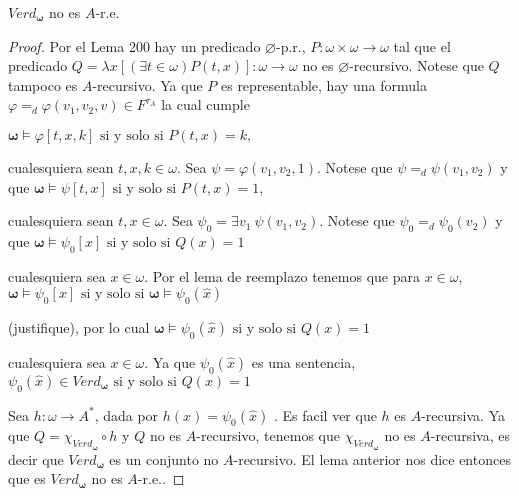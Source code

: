   \begin{lemma}
    \(Verd_{\mathbf{\omega }}\) no es \(A\)-r.e.
  \end{lemma}
  \begin{proof}
    Por el Lema 200 hay un predicado \(\varnothing \)-p.r., \( P:\omega \times \omega \rightarrow \omega \) tal que el predicado \(Q=\lambda x \left[ (\exists t\in \omega )P(t,x)\right] :\omega \rightarrow \omega \) no es \(\varnothing \)-recursivo. Notese que \(Q\) tampoco es \(A\)-recursivo. Ya que \(P \) es representable, hay una formula \(\varphi =_{d}\varphi (v_{1},v_{2},v)\in F^{\tau _{A}}\) la cual cumple

    \(\displaystyle \mathbf{\omega }\models \varphi \left[ t,x,k\right] \text{ si y solo si } P(t,x)=k, \)

    cualesquiera sean \(t,x,k\in \omega .\) Sea \(\psi =\varphi (v_{1},v_{2},1)\). Notese que \(\psi =_{d}\psi (v_{1},v_{2})\) y que
    \(\displaystyle \mathbf{\omega }\models \psi \left[ t,x\right] \text{ si y solo si }P(t,x)=1 \text{,} \)

    cualesquiera sean \(t,x\in \omega .\) Sea \(\psi _{0}=\exists v_{1}\ \psi (v_{1},v_{2})\). Notese que \(\psi _{0}=_{d}\psi _{0}(v_{2})\) y que
    \(\displaystyle \mathbf{\omega }\models \psi _{0}\left[ x\right] \text{ si y solo si }Q(x)=1 \)

    cualesquiera sea \(x\in \omega \). Por el lema de reemplazo tenemos que para \( x\in \omega \),
    \(\displaystyle \mathbf{\omega }\models \psi _{0}\left[ x\right] \text{ si y solo si } \mathbf{\omega }\models \psi _{0}(\widehat{x}) \)

    (justifique), por lo cual
    \(\displaystyle \mathbf{\omega }\models \psi _{0}(\widehat{x})\text{ si y solo si }Q(x)=1 \)

    cualesquiera sea \(x\in \omega \). Ya que \(\psi _{0}(\widehat{x})\) es una sentencia,
    \(\displaystyle \psi _{0}(\widehat{x})\in Verd_{\mathbf{\omega }}\text{ si y solo si }Q(x)=1 \)

    Sea \(h:\omega \rightarrow A^{\ast }\), dada por \(h(x)=\psi _{0}(\widehat{x})\) . Es facil ver que \(h\) es \(A\)-recursiva. Ya que \(Q=\chi _{Verd_{\mathbf{ \omega }}}\circ h\) y \(Q\) no es \(A\)-recursivo, tenemos que \(\chi _{Verd_{ \mathbf{\omega }}}\) no es \(A\)-recursiva, es decir que \(Verd_{\mathbf{\omega } }\) es un conjunto no \(A\)-recursivo. El lema anterior nos dice entonces que es \(Verd_{\mathbf{\omega }}\) no es \(A\)-r.e..
  \end{proof}

